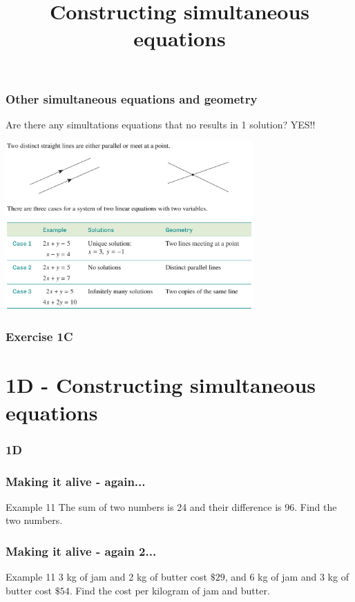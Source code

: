 \documentclass{beamer}
\begin{document}
\begin{frame}
    \frametitle{Other simultaneous equations and geometry}
    Are there any simultations equations that no results in 1 solution? YES!!
    \begin{center}
        \includegraphics[width = 9.5cm]{Geometry.png}
    \end{center}
\end{frame}

\begin{frame}
    \frametitle{Exercise 1C}
\end{frame}


\section{1D - Constructing simultaneous equations}
\begin{frame}
    \frametitle{1D}
    \begin{center}
        \title{Constructing simultaneous equations}
        \maketitle
    \end{center}
\end{frame}

\begin{frame}[t]
    \frametitle{Making it alive - again...}
    \begin{block}{Example 11}
        The sum of two numbers is 24 and their difference is 96. Find the two numbers.
    \end{block}
\end{frame}

\begin{frame}[t]
    \frametitle{Making it alive - again 2...}
    \begin{block}{Example 11}
        3 kg of jam and 2 kg of butter cost $\$29$, and 6 kg of jam and 3 kg of butter cost $\$54$.
        Find the cost per kilogram of jam and butter.
    \end{block}
\end{frame}
\end{document}
